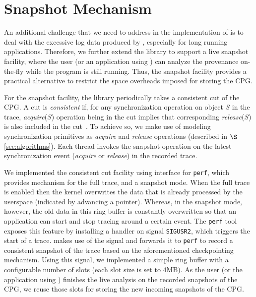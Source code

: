\section{Snapshot Mechanism}
\label{sec:snapshot}
An additional challenge that we need to address in the implementation of \projecttitle is to deal with the excessive log data produced by \intelpt, especially for long running applications. Therefore, we further extend the library to support a live snapshot facility, where the user (or an application using \projecttitle) can analyze the provenance on-the-fly while the program is still running. Thus, the snapshot facility provides a practical alternative to restrict the space overheads imposed for storing the CPG. 

For the snapshot facility, the library periodically takes a consistent cut of the CPG. A cut is {\em consistent} if, for any synchronization operation on object $S$ in the trace,  {\em acquire}($S$) operation being in the cut implies that corresponding {\em release}($S$) is also included in the cut~\cite{chandy-lamport}.  To achieve so, we make use of modeling synchronization primitives as {\em acquire} and {\em release} operations (described in $\S$\ref{sec:algorithms}). Each thread invokes the snapshot operation on the latest synchronization event ({\em acquire} or {\em release}) in the recorded trace.


We implemented the consistent cut facility using \intelpt interface for {\tt perf},
which provides mechanism for the full trace, and a snapshot mode.
When the full trace is enabled then the kernel overwrites the data that is already processed by
the userspace (indicated by advancing a pointer). %
Whereas, in the snapshot mode, however, the old data in this ring buffer is constantly overwritten so that an application
can start and stop tracing around a certain event. %
The {\tt perf} tool exposes this feature by installing a handler on
signal {\tt SIGUSR2}, which triggers the start of a trace. \projecttitle makes use of the signal
and forwards it to {\tt perf} to record a consistent snapshot of the trace based on the aforementioned checkpointing mechanism.  Using this signal, we implemented a simple ring buffer with a configurable number of slots (each slot size is set to $4$MB). As the user (or the application using \projecttitle) finishes the live analysis on the recorded snapshots of the CPG, we reuse those slots for storing the new incoming snapshots of the CPG. %


